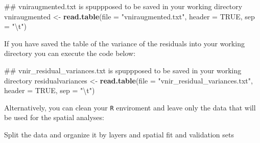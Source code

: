 \documentclass[]{book}
\newenvironment{Shaded}{\begin{snugshade}}{\end{snugshade}}
\newcommand{\CharTok}[1]{\textcolor[rgb]{0.31,0.60,0.02}{#1}}
\newcommand{\DataTypeTok}[1]{\textcolor[rgb]{0.13,0.29,0.53}{#1}}
\newcommand{\KeywordTok}[1]{\textcolor[rgb]{0.13,0.29,0.53}{\textbf{#1}}}
\newcommand{\NormalTok}[1]{#1}
\newcommand{\OperatorTok}[1]{\textcolor[rgb]{0.81,0.36,0.00}{\textbf{#1}}}
\newcommand{\OtherTok}[1]{\textcolor[rgb]{0.56,0.35,0.01}{#1}}
\newcommand{\StringTok}[1]{\textcolor[rgb]{0.31,0.60,0.02}{#1}}
\begin{document}
\begin{Shaded}
\begin{Highlighting}[]
\NormalTok{## vniraugmented.txt is spuppposed to be saved in your working directory}
\NormalTok{vniraugmented <-}\StringTok{ }\KeywordTok{read.table}\NormalTok{(}\DataTypeTok{file =} \StringTok{"vniraugmented.txt"}\NormalTok{, }
                            \DataTypeTok{header =} \OtherTok{TRUE}\NormalTok{, }
                            \DataTypeTok{sep =} \StringTok{"}\CharTok{\textbackslash{}t}\StringTok{"}\NormalTok{)}
\end{Highlighting}
\end{Shaded}

If you have saved the table of the variance of the residuals into your working directory you can execute the code below:

\begin{Shaded}
\begin{Highlighting}[]
\NormalTok{## vnir_residual_variances.txt is spuppposed to be saved in your working directory}
\NormalTok{residualvariances <-}\StringTok{ }\KeywordTok{read.table}\NormalTok{(}\DataTypeTok{file =} \StringTok{"vnir_residual_variances.txt"}\NormalTok{, }
                                \DataTypeTok{header =} \OtherTok{TRUE}\NormalTok{, }
                                \DataTypeTok{sep =} \StringTok{"}\CharTok{\textbackslash{}t}\StringTok{"}\NormalTok{)}
\end{Highlighting}
\end{Shaded}

Alternatively, you can clean your \texttt{R} enviroment and leave only the data that will be used for the spatial analyses:

\begin{Shaded}
\end{Shaded}

Split the data and organize it by layers and spatial fit and validation sets
\end{document}
